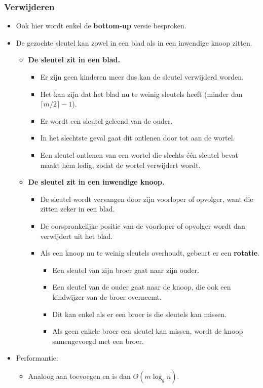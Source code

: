 \subsubsection{Verwijderen}
\begin{itemize}
    \item Ook hier wordt enkel de \textbf{bottom-up} versie besproken.
    \item De gezochte sleutel kan zowel in een blad als in een inwendige knoop zitten.
    \begin{itemize}
        \item \textbf{De sleutel zit in een blad.}
        \begin{itemize}
            \item Er zijn geen kinderen meer dus kan de sleutel verwijderd worden.
            \item Het kan zijn dat het blad nu te weinig sleutels heeft (minder dan $\lceil m/2 \rceil - 1$).
            \item Er wordt een sleutel geleend van de ouder.
            \item In het slechtste geval gaat dit ontlenen door tot aan de wortel.
            \item Een sleutel ontlenen van een wortel die slechts één sleutel bevat maakt hem ledig, zodat de wortel verwijdert wordt.
        \end{itemize}
        \item \textbf{De sleutel zit in een inwendige knoop.}
        \begin{itemize}
            \item De sleutel wordt vervangen door zijn voorloper of opvolger, want die zitten zeker in een blad.
            \item De oorspronkelijke positie van de voorloper of opvolger wordt dan verwijdert uit het blad.
            \item Als een knoop nu te weinig sleutels overhoudt, gebeurt er een \textbf{rotatie}.
            \begin{itemize}
                \item Een sleutel van zijn broer gaat naar zijn ouder.
                \item Een sleutel van de ouder gaat naar de knoop, die ook een kindwijzer van de broer overneemt.
                \item Dit kan enkel als er een broer is die sleutels kan missen.
                \item Als geen enkele broer een sleutel kan missen, wordt de knoop samengevoegd met een broer.
            \end{itemize}
        \end{itemize}
    \end{itemize}
    \item Performantie:
    \begin{itemize}
        \item Analoog aan toevoegen en is dan $O(m\log_g n)$.
    \end{itemize}
\end{itemize}
